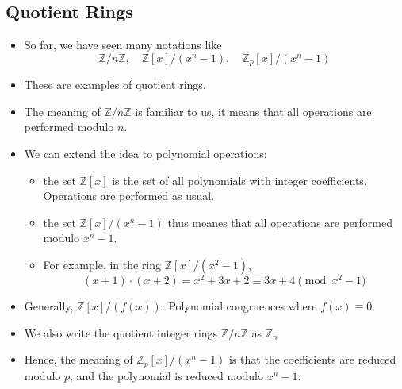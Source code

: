 \subsection{Quotient Rings}
\begin{frame}
    \begin{itemize}
        \item So far, we have seen many notations like 
            \[ \mathbb{Z}/ n\mathbb{Z}, \quad \mathbb{Z}[x]/(x^n - 1), \quad \mathbb{Z}_{p}[x]/(x^n - 1)  \]
        \item These are examples of quotient rings. 
        \item The meaning of \( \mathbb{Z}/n\mathbb{Z} \) is familiar to us, 
              it means that all operations are performed modulo \(n\).
        \item We can extend the idea to polynomial operations: 
              \begin{itemize}
                   \item the set \( \mathbb{Z}[x] \) is the set of all polynomials 
                         with integer coefficients. 
                         Operations are performed as usual.
                   \item the set \( \mathbb{Z}[x]/(x^n - 1) \) thus meanes that 
                         all operations are performed modulo \(x^n - 1\).
                   \item For example, in the ring \( \mathbb{Z}[x]/(x^2 - 1) \), 
                       \[ (x + 1) \cdot (x + 2) = x^2 + 3x + 2 \equiv 3x + 4 \pmod{x^2 - 1} \]
              \end{itemize}
 
        \item Generally, \(\mathbb{Z}[x]/(f(x))\): Polynomial congruences where \(f(x) \equiv 0\).
        \item We also write the quotient integer rings \(\mathbb{Z} / n\mathbb{Z}\) as \(\mathbb{Z}_n\)
        \item Hence, the meaning of \(\mathbb{Z}_{p}[x]/(x^n - 1)\) 
              is that the coefficients are reduced modulo \(p\),
              and the polynomial is reduced modulo \(x^n - 1\).
  \end{itemize}
\end{frame}


